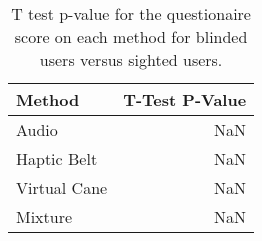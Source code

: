 
\begin{table}[!htb]
\centering
\caption{T test p-value for the questionaire score on each method for blinded users versus sighted users.}
\label{tab:ttest_questionaires}
\begin{tabular}{lr}
\toprule
      Method &  T-Test P-Value \\
\midrule
       Audio &             NaN \\
 Haptic Belt &             NaN \\
Virtual Cane &             NaN \\
     Mixture &             NaN \\
\bottomrule
\end{tabular}
\end{table}

